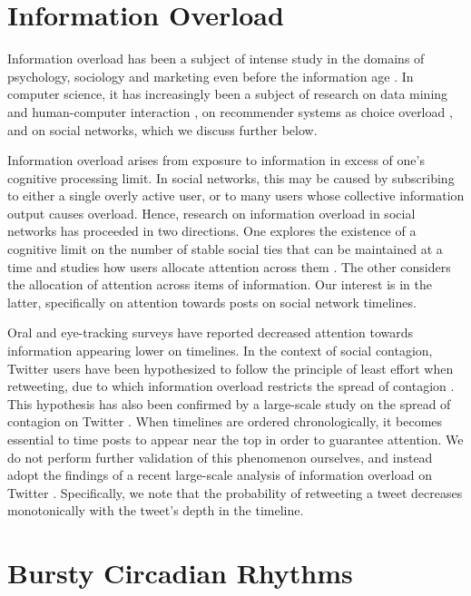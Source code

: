 \documentclass[onecolumn, 12 pt, doublespace, fullpage, letterpaper]{report}
\begin{document}
\section{Information Overload}

Information overload has been a subject of intense study in the domains of psychology, sociology and marketing even before the information age \cite{eppler2004concept}. In computer science, it has increasingly been a subject of research on data mining and human-computer interaction \cite{Shahaf:2010:CDN:1835804.1835884}, on recommender systems as choice overload \cite{Bollen:2010:UCO:1864708.1864724}, and on social networks, which we discuss further below.

Information overload arises from exposure to information in excess of one's cognitive processing limit. In social networks, this may be caused by subscribing to either a single overly active user, or to many users whose collective information output causes overload. Hence, research on information overload in social networks has proceeded in two directions. One explores the existence of a cognitive limit on the number of stable social ties that can be maintained at a time and studies how users allocate attention across them \cite{backstrom2011center,gonccalves2011modeling}. The other considers the allocation of attention across items of information. Our interest is in the latter, specifically on attention towards posts on social network timelines.

Oral \cite{bontcheva2013overload} and eye-tracking surveys \cite{counts2011taking} have reported decreased attention towards information appearing lower on timelines. In the context of social contagion, Twitter users have been hypothesized to follow the principle of least effort when retweeting, due to which information overload restricts the spread of contagion \cite{hodas2012simple}. This hypothesis has also been confirmed by a large-scale study on the spread of contagion on Twitter \cite{weng2012twitter}. When timelines are ordered chronologically, it becomes essential to time posts to appear near the top in order to guarantee attention. We do not perform further validation of this phenomenon ourselves, and instead adopt the findings of a recent large-scale analysis of information overload on Twitter \cite{gomez2014quantifying}. Specifically, we note that the  probability of retweeting a tweet decreases monotonically with the tweet's depth in the timeline.

\section{Bursty Circadian Rhythms}
\label{ch:bursty-circadian}
\end{document}

